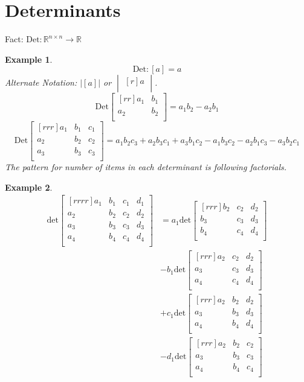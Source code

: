 \documentclass{report}
\newtheorem*{ex}{Example}
\begin{document}
\section{Determinants}
Fact: $\mathrm{Det:}\mathbb{R}^{n \times n} \rightarrow \mathbb{R}$
\begin{ex}
\[ \mathrm{Det:}[a] = a \]
Alternate Notation: $|[a]|$ or $\begin{vmatrix}[r]a\\\end{vmatrix}$.
\[ \mathrm{Det}\begin{bmatrix}[rr]a_1&b_1\\a_2&b_2\\\end{bmatrix}=a_1b_2-a_2b_1 \]
\[ \mathrm{Det}\begin{bmatrix}[rrr]a_1&b_1&c_1\\a_2&b_2&c_2\\a_3&b_3&c_3\\\end{bmatrix}=a_1b_2c_3+a_2b_3c_1+a_3b_1c_2-a_1b_3c_2-a_2b_1c_3-a_3b_2c_1 \]
The pattern for number of items in each determinant is following factorials.
\end{ex}
\begin{ex}
\begin{align*}
\mathrm{det}\begin{bmatrix}[rrrr]a_1&b_1&c_1&d_1\\a_2&b_2&c_2&d_2\\a_3&b_3&c_3&d_3\\a_4&b_4&c_4&d_4\\\end{bmatrix}&=a_1\mathrm{det}\begin{bmatrix}[rrr]b_2&c_2&d_2\\b_3&c_3&d_3\\b_4&c_4&d_4\\\end{bmatrix}\\
&-b_1\mathrm{det}\begin{bmatrix}[rrr]a_2&c_2&d_2\\a_3&c_3&d_3\\a_4&c_4&d_4\\\end{bmatrix}\\
&+c_1\mathrm{det}\begin{bmatrix}[rrr]a_2&b_2&d_2\\a_3&b_3&d_3\\a_4&b_4&d_4\\\end{bmatrix}\\
&-d_1\mathrm{det}\begin{bmatrix}[rrr]a_2&b_2&c_2\\a_3&b_3&c_3\\a_4&b_4&c_4\\\end{bmatrix}
\end{align*}
\end{ex}
\end{document}
